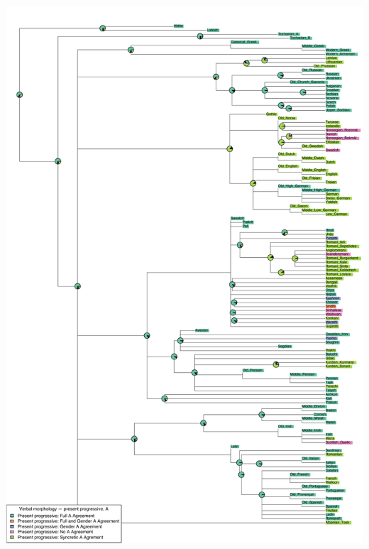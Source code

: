 \includegraphics[width=.9\linewidth]{supp-graphics/VerbalmorphologypresentprogressiveAPROGAAGRFULLVerbalmorphologypresentprogressiveAPROGAGenderAGRVerbalmorphologypresentprogressiveAPROGNOAAGR.pdf}

